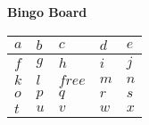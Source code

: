 \documentclass{article}
\begin{document}
    \begin{center}
        \huge
        \textbf{Bingo Board}
    \end{center}
    \hspace{5cm}

    \begin{center}
        \renewcommand{\arraystretch}{3}
        \begin{tabularx}{0.8\textwidth} {
                | >{\centering\arraybackslash}X
                | >{\centering\arraybackslash}X
                | >{\centering\arraybackslash}X
                | >{\centering\arraybackslash}X
                | >{\centering\arraybackslash}X | }
            \hline
            $a$ & $b$ & $c$ & $d$ & $e$ \\
            \hline
            $f$ & $g$ & $h$ & $i$ & $j$ \\
            \hline
            $k$ & $l$ & $free$ & $m$ & $n$ \\
            \hline
            $o$ & $p$ & $q$ & $r$ & $s$ \\
            \hline
            $t$ & $u$ & $v$ & $w$ & $x$ \\
            \hline
        \end{tabularx}
    \end{center}
\end{document}
